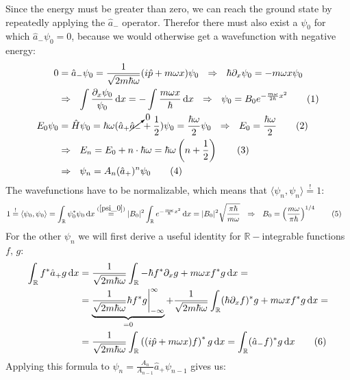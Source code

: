 \documentclass[a4paper,12pt]{article}
\newcommand\numberthis{\addtocounter{equation}{1}\tag{\theequation}}
\begin{document}
Since the energy must be greater than zero, we can reach the ground state by repeatedly applying the $\hat{a}_-$ operator. Therefor there must also exist a $\psi_0$ for which $\hat{a}_-\psi_0=0$, because we would otherwise get a wavefunction with negative energy:
\begin{align*}
0&=\hat{a}_-\psi_0=\frac{1}{\sqrt{2m\hbar\omega}}(i\hat{p}+m\omega x)\psi_0\ \ \Rightarrow\ \ \hbar\partial_x\psi_0=-m\omega x\psi_0\\
&\Rightarrow\ \ \int\frac{\partial_x\psi_0}{\psi_0}\,\mathrm{d}x=-\int\frac{m\omega x}{\hbar}\,\mathrm{d}x\ \ \Rightarrow\ \ \psi_0=B_0e^{-\frac{m\omega}{2\hbar}x^2}\label{psi_0}\numberthis\\
E_0\psi_0&=\hat{H}\psi_0=\hbar\omega (\hat{a}_+\cancelto{0}{\hat{a}_-}+\frac{1}{2})\psi_0=\frac{\hbar\omega}{2}\psi_0\ \ \Rightarrow\ \ E_0=\frac{\hbar\omega}{2} \label{E_0}\numberthis\\
&\Rightarrow\ \ E_n=E_0+n\cdot\hbar\omega=\hbar\omega \left(n+\frac{1}{2}\right) \label{E_n}\numberthis\\
&\Rightarrow\ \ \psi_n=A_n(\hat{a}_+)^n\psi_0 \label{psi_n}\numberthis
\end{align*}
The wavefunctions have to be normalizable, which means that $\langle\psi_n,\psi_n\rangle\overset{!}{=}1$: 
\begin{align*}
1&\overset{!}{=}\langle\psi_0,\psi_0\rangle =\int_\mathbb{R}\psi_0^\ast\psi_0\,\mathrm{d}x\overset{(\ref{psi_0})}{=}|B_0|^2\int_\mathbb{R}e^{-\frac{m\omega}{\hbar}x^2}\,\mathrm{d}x=|B_0|^2\sqrt{\frac{\pi\hbar}{m\omega}}\ \ \Rightarrow\ \ B_0=\left(\frac{m\omega}{\pi\hbar}\right)^{1/4}\label{B_0}\numberthis
\end{align*}
For the other $\psi_n$ we will first derive a useful identity for $\mathbb{R}-$integrable functions $f,\, g$:
\begin{align*}
\int_\mathbb{R}f^\ast\hat{a}_+g\,\mathrm{d}x&=\frac{1}{\sqrt{2m\hbar\omega}}\int_\mathbb{R}-\hbar f^\ast \partial_x g+m\omega x f^\ast g\,\mathrm{d}x=\\
&=\underbrace{\frac{1}{\sqrt{2m\hbar\omega}}\hbar f^\ast g\bigg\vert_{-\infty}^\infty}_{=0}+\frac{1}{\sqrt{2m\hbar\omega}}\int_\mathbb{R}(\hbar\partial_x f)^\ast g+m\omega x f^\ast g\,\mathrm{d}x=\\
&=\frac{1}{\sqrt{2m\hbar\omega}}\int_\mathbb{R}\left((i\hat{p}+m\omega x) f\right)^\ast g\,\mathrm{d}x=\int_\mathbb{R}(\hat{a}_-f)^\ast g\,\mathrm{d}x\label{f stern g integral}\numberthis
\end{align*}
Applying this formula to $\psi_n=\frac{A_n}{A_{n-1}}\hat{a}_+\psi_{n-1}$ gives us:
\end{document}
